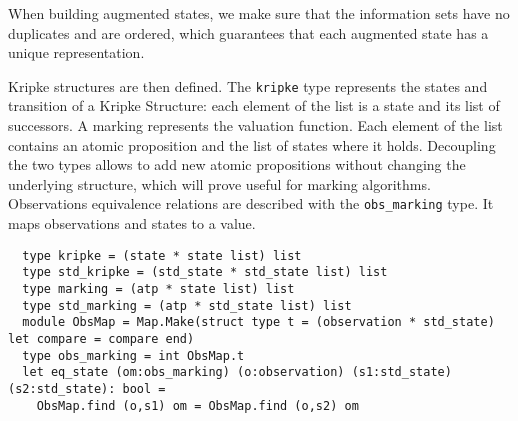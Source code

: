 \documentclass[dvipsnames]{acmart}
\begin{document}
When building augmented states, we make sure that the information sets have no duplicates and are ordered, which guarantees that each augmented state has a unique representation.

Kripke structures are then defined. The \lstinline{kripke} type represents the states and transition of a Kripke Structure: each element of the list is a state and its list of successors.
A marking represents the valuation function. Each element of the list contains an atomic proposition and the list of states where it holds.
Decoupling the two types allows to add new atomic propositions without changing the underlying structure, which will prove useful for marking algorithms.
Observations equivalence relations are described with the \lstinline{obs_marking} type. It maps observations and states to a value. 

\begin{lstlisting}
  type kripke = (state * state list) list
  type std_kripke = (std_state * std_state list) list
  type marking = (atp * state list) list
  type std_marking = (atp * std_state list) list
  module ObsMap = Map.Make(struct type t = (observation * std_state) let compare = compare end)
  type obs_marking = int ObsMap.t
  let eq_state (om:obs_marking) (o:observation) (s1:std_state) (s2:std_state): bool =
    ObsMap.find (o,s1) om = ObsMap.find (o,s2) om
\end{lstlisting}
\end{document}
